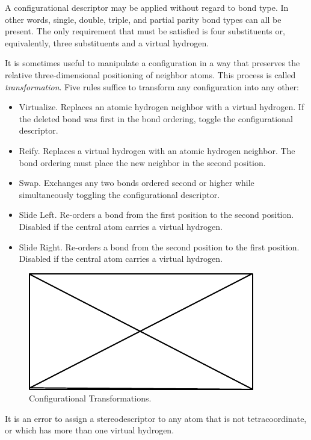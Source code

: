 \documentclass{article}
\begin{document}
A configurational descriptor may be applied without regard to bond type. In other words, single, double, triple, and partial parity bond types can all be present. The only requirement that must be satisfied is four substituents or, equivalently, three substituents and a virtual hydrogen.

It is sometimes useful to manipulate a configuration in a way that preserves the relative three-dimensional positioning of neighbor atoms. This process is called \textit{transformation}. Five rules suffice to transform any configuration into any other:

\begin{itemize}
    \item{Virtualize. Replaces an atomic hydrogen neighbor with a virtual hydrogen. If the deleted bond was first in the bond ordering, toggle the configurational descriptor.}
    \item{Reify. Replaces a virtual hydrogen with an atomic hydrogen neighbor. The bond ordering must place the new neighbor in the second position.}
    \item{Swap. Exchanges any two bonds ordered second or higher while simultaneously toggling the configurational descriptor.}
    \item{Slide Left. Re-orders a bond from the first position to the second position. Disabled if the central atom carries a virtual hydrogen.}
    \item{Slide Right. Re-orders a bond from the second position to the first position. Disabled if the central atom carries a virtual hydrogen.}
\end{itemize}

\begin{figure}
    \centering
    \includegraphics{filler}
    \caption{Configurational Transformations.}
    \label{fig:iconfigurational-transformations}
\end{figure}

It is an error to assign a stereodescriptor to any atom that is not tetracoordinate, or which has more than one virtual hydrogen.
\end{document}
